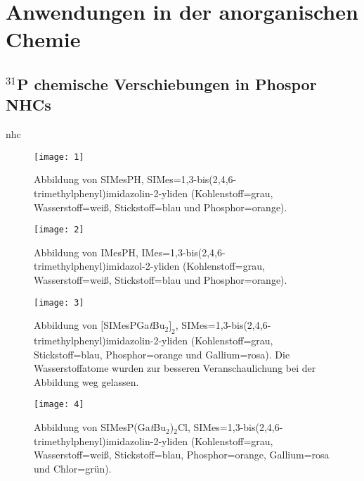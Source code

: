 \section{Anwendungen in der anorganischen Chemie}
\FloatBarrier
\subsection{\texorpdfstring{$^{31}$P}{31P} chemische Verschiebungen in Phospor NHCs}
\ac{nhc}
\begin{figure}[ht!]
	\centering
	\texttt{[image: 1]}
	\captionsetup{figurewithin = chapter}
	\captionsetup{font=small, labelfont=bf}\caption[Abbildung von SIMesPH]{Abbildung von SIMesPH, SIMes=1,3-bis(2,4,6-tri\-me\-thyl\-phe\-nyl)imi\-da\-zo\-lin-2-yli\-den (Kohlenstoff=grau, Wasserstoff=weiß, Stickstoff=blau und Phosphor=orange).}
\label{abb:cvh1}
\end{figure}

\begin{figure}[ht!]
	\centering
	\texttt{[image: 2]}
	\captionsetup{figurewithin = chapter}
	\captionsetup{font=small, labelfont=bf}\caption[Abbildung von IMesPH]{Abbildung von IMesPH, IMes=1,3-bis(2,4,6-tri\-me\-thyl\-phe\-nyl)imi\-da\-zol-2-yli\-den (Kohlenstoff=grau, Wasserstoff=weiß, Stickstoff=blau und Phosphor=orange).}
\label{abb:cvh2}
\end{figure}

\begin{figure}[ht!]
	\centering
	\texttt{[image: 3]}
	\captionsetup{figurewithin = chapter}
	\captionsetup{font=small, labelfont=bf}\caption[{Abbildung von $[$SIMesPGa\textit{t}Bu$_2]_2$}]{Abbildung von $[$SIMesPGa\textit{t}Bu$_2]_2$, SIMes=1,3-bis(2,4,6-tri\-me\-thyl\-phe\-nyl)imi\-da\-zo\-lin-2-yli\-den (Kohlenstoff=grau, Stickstoff=blau, Phosphor=orange und Gallium=rosa). Die Wasserstoffatome wurden zur besseren Veranschaulichung bei der Abbildung weg gelassen.}
\label{abb:cvh3}
\end{figure}

\begin{figure}[ht!]
	\centering
	\texttt{[image: 4]}
	\captionsetup{figurewithin = chapter}
	\captionsetup{font=small, labelfont=bf}\caption[Abbildung von SIMesP(Ga\textit{t}Bu$_2$)$_2$Cl]{Abbildung von SIMesP(Ga\textit{t}Bu$_2$)$_2$Cl, SIMes=1,3-bis(2,4,6-tri\-me\-thyl\-phe\-nyl)imi\-da\-zo\-lin-2-yli\-den (Kohlenstoff=grau, Wasserstoff=weiß, Stickstoff=blau, Phosphor=orange, Gallium=rosa und Chlor=grün).}
\label{abb:cvh4}
\end{figure}

